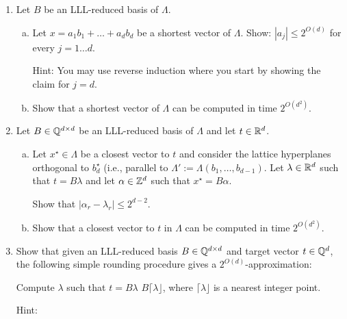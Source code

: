 \begin{enumerate}
  \item
    Let $B$ be an LLL-reduced basis of $\Lambda$.
    \begin{enumerate}[(a)]
      \item Let $x = a_1 b_1 + \dots + a_d b_d$ be a shortest vector of $\Lambda$.
        Show: $|a_j| \leq 2^{O(d)}$ for every $j = 1 \dots d$.

        Hint: You may use reverse induction where you start by showing the claim for $j = d$.

      \item Show that a shortest vector of $\Lambda$ can be computed in time $2^{O(d^2)}$.
    \end{enumerate}

  \item
    Let $B \in \mathbb{Q}^{d \times d}$ be an LLL-reduced basis of $\Lambda$ and let $t \in \mathbb{R}^d$.
    \begin{enumerate}[(a)]
      \item Let $x^\star \in \Lambda$ be a closest vector to $t$ and consider the lattice hyperplanes
        orthogonal to $b_d^\star$ (i.e., parallel to $\Lambda' := \Lambda(b_1,\ldots,b_{d-1})$.
        Let $\lambda \in \mathbb{R}^d$ such that $t = B \lambda$
        and let $\alpha \in \mathbb{Z}^d$ such that $x^\star = B \alpha$.

        Show that $|\alpha_r - \lambda_r| \leq 2^{d-2}$.

      \item Show that a closest vector to $t$ in $\Lambda$ can be computed in time $2^{O(d^2)}$.
    \end{enumerate}

  \item
    Show that given an LLL-reduced basis $B \in \mathbb{Q}^{d \times d}$ and target vector $t \in \mathbb{Q}^d$,
    the following simple rounding procedure gives a $2^{O(d)}$-approximation:
    \begin{codebox}
      \li Compute $\lambda$ such that $t = B \lambda$
      \li \Return $B \lceil \lambda \rfloor$, where $\lceil \lambda \rfloor$ is a nearest integer point.
    \end{codebox}

    Hint: \cite{MR856638}
\end{enumerate}
